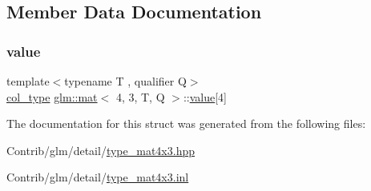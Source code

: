 \subsection{Member Data Documentation}
\mbox{\label{structglm_1_1mat_3_014_00_013_00_01_t_00_01_q_01_4_ad14b8b7424e4b4cadee7d85cedc61b7a}} 
\subsubsection{\texorpdfstring{value}{value}}
{\footnotesize\ttfamily template$<$typename T , qualifier Q$>$ \\
\mbox{\hyperlink{structglm_1_1mat_3_014_00_013_00_01_t_00_01_q_01_4_ab7cb76d6290691108c8af724270e3b6c}{col\+\_\+type}} \mbox{\hyperlink{structglm_1_1mat}{glm\+::mat}}$<$ 4, 3, T, Q $>$\+::\mbox{\hyperlink{_s_d_l__opengl__glext_8h_a8ad81492d410ff2ac11f754f4042150f}{value}}\mbox{[}4\mbox{]}\hspace{0.3cm}{\ttfamily [private]}}



The documentation for this struct was generated from the following files\+:\begin{DoxyCompactItemize}
\item 
Contrib/glm/detail/\mbox{\hyperlink{type__mat4x3_8hpp}{type\+\_\+mat4x3.\+hpp}}\item 
Contrib/glm/detail/\mbox{\hyperlink{type__mat4x3_8inl}{type\+\_\+mat4x3.\+inl}}\end{DoxyCompactItemize}
